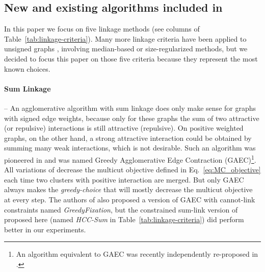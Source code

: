 \begin{algorithm}[t]
\end{algorithm}


\subsection{New and existing algorithms included in \algname{}} \label{sec:alg_update_rules}


In this paper we focus on five linkage methods (see columns of Table~\ref{tab:linkage-criteria}). Many more linkage criteria have been applied to unsigned graphs \cite{nunez2013machine,felzenszwalb2004efficient,funke2018large}, involving median-based or size-regularized methods, but we decided to focus this paper on those five criteria because they represent the most known choices.  

\paragraph{Sum Linkage} -- 
An agglomerative algorithm with sum linkage does only make sense for graphs with signed edge weights, because only for these graphs the sum of two attractive (or repulsive) interactions is still attractive (repulsive). On positive weighted graphs, on the other hand, a strong attractive interaction could be obtained by summing many weak interactions, which is not desirable. Such an algorithm was pioneered in \cite{levinkov2017comparative,keuper2015efficient} and was named Greedy Agglomerative Edge Contraction (GAEC)\footnote{An algorithm equivalent to GAEC was recently independently re-proposed in \cite{chehreghani2020hierarchical}.}. All variations of \algname{} decrease the multicut objective defined in Eq.~\ref{eq:MC_objective} each time two clusters with positive interaction are merged. But only GAEC always makes the \emph{greedy-choice} that will mostly decrease the multicut objective at every step. The authors of \cite{levinkov2017comparative} also proposed a version of GAEC with cannot-link constraints named \emph{GreedyFixation}, but the constrained sum-link version of \algname{} proposed here (named \emph{HCC-Sum} in Table~\ref{tab:linkage-criteria}) did perform better in our experiments.

